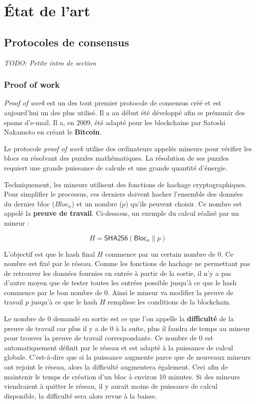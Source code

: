 \documentclass[../tb_report.tex]{subfiles}
\begin{document}
\chapter{État de l'art}
\label{ch:etat_art}

\section{Protocoles de consensus}

\textit{TODO: Petite intro de section}

\subsection{Proof of work}
\label{consensus:pow}

\textit{Proof of work} est un des tout premier protocole de consensus créé et est aujourd'hui un des plus utilisé. Il a au début été développé afin se prémunir des spams d'e-mail. Il a, en 2009, été adapté pour les blockchains par Satoshi Nakamoto en créant le \textbf{Bitcoin}.

Le protocole \textit{proof of work} utilise des ordinateurs appelés mineurs pour vérifier les blocs en résolvant des puzzles mathématiques. La résolution de ses puzzles requiert une grande puissance de calcule et une grande quantité d'énergie.

Techniquement, les mineurs utilisent des fonctions de hachage cryptographiques. Pour simplifier le processus, ces derniers doivent hacher l'ensemble des données du dernier bloc ($Bloc_n$) et un nombre ($p$) qu'ils peuvent choisir. Ce nombre est appelé la \textbf{preuve de travail}. Ci-dessous, un exemple du calcul réalisé par un mineur :

\begin{equation*}
    H = \textsf{SHA256}(\textsf{Bloc}_n \| p)
\end{equation*}

L'objectif est que le hash final $H$ commence par un certain nombre de 0. Ce nombre est fixé par le réseau. Comme les fonctions de hachage ne permettant pas de retrouver les données fournies en entrée à partir de la sortie, il n'y a pas d'autre moyen que de tester toutes les entrées possible jusqu'à ce que le hash commence par le bon nombre de 0. Ainsi le mineur va modifier la preuve de travail $p$ jusqu'à ce que le hash $H$ remplisse les conditions de la blockchain. 

Le nombre de 0 demandé en sortie est ce que l'on appelle la \textbf{difficulté} de la preuve de travail car plus il y a de 0 à la suite, plus il faudra de temps au mineur pour trouver la preuve de travail correspondante. Ce nombre de 0 est automatiquement définit par le réseau et est adapté à la puissance de calcul globale. C'est-à-dire que si la puissance augmente parce que de nouveaux mineurs ont rejoint le réseau, alors la difficulté augmentera également. Ceci afin de maintenir le temps de création d'un bloc à environ 10 minutes. Si des mineurs viendraient à quitter le réseau, il y aurait moins de puissance de calcul disponible, la difficulté sera alors revue à la baisse.
\end{document}
